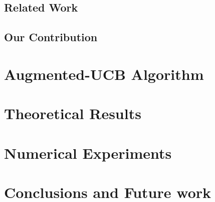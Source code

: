 \documentclass{article}
\begin{document}
\subsection{Related Work}
\label{prevRes}


\subsection{Our Contribution}
\label{contribution}

%
%
%
%
\section{Augmented-UCB Algorithm}
\label{algorithm}

%
\section{Theoretical Results}
\label{results}

%
%
\section{Numerical Experiments}
\label{expt}



\section{Conclusions and Future work}
\label{conclusion}



\clearpage
\newpage



%
\end{document}
